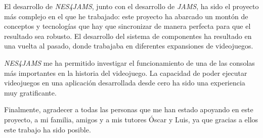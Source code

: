 El desarrollo de \textit{NES4JAMS}, junto con el desarrollo
de \textit{JAMS}, ha sido el proyecto más complejo en el
que he trabajado:
este proyecto ha abarcado un montón de conceptos y tecnologías
que hay que sincronizar de manera perfecta para que el resultado
sea robusto.
El desarrollo del sistema de componentes ha resultado en una
vuelta al pasado, donde trabajaba en diferentes expansiones
de videojuegos.

\textit{NES4JAMS} me ha permitido investigar el funcionamiento
de una de las consolas más importantes en la
historia del videojuego.
La capacidad de poder ejecutar videojuegos en una aplicación
desarrollada desde cero ha sido una experiencia muy gratificante.

Finalmente, agradecer a todas las personas que me han
estado apoyando en este proyecto, a mi familia, amigos y a mis
tutores Óscar y Luis, ya que gracias a ellos este trabajo
ha sido posible.